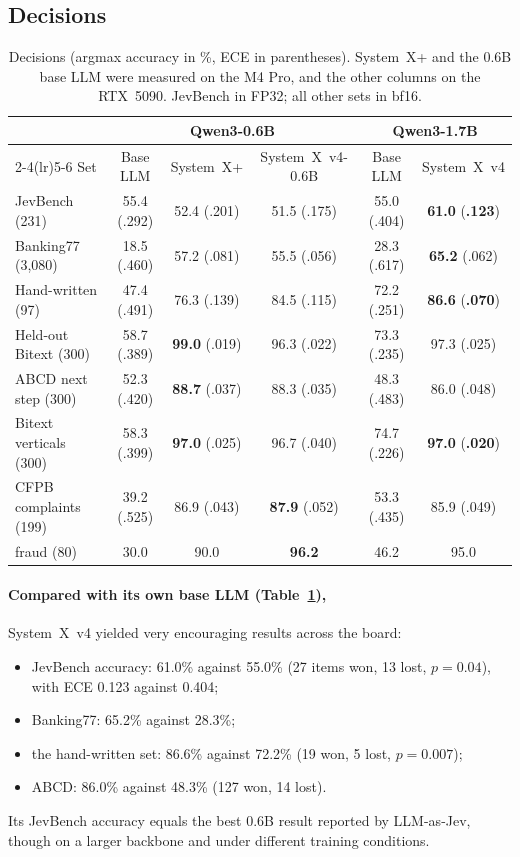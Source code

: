 \documentclass[11pt]{article}
\newcommand{\sysplus}{System~X+}
\newcommand{\sysfour}{System~X~v4}
\newcommand{\sysfoursmall}{System~X~v4-0.6B}
\begin{document}
\subsection{Decisions}

\begin{table}[t]
\centering
\caption{Decisions (argmax accuracy in \%, ECE in parentheses). \sysplus{} and the 0.6B base LLM were measured on the M4 Pro, and the other columns on the RTX~5090. JevBench in FP32; all other sets in bf16.}
\label{tab:v4}
\small
\setlength{\tabcolsep}{3pt}
\begin{tabular}{lccccc}
\toprule
& \multicolumn{3}{c}{Qwen3-0.6B} & \multicolumn{2}{c}{Qwen3-1.7B} \\
\cmidrule(lr){2-4}\cmidrule(lr){5-6}
Set & Base LLM & \sysplus{} & \sysfoursmall{} & Base LLM & \sysfour{} \\
\midrule
JevBench (231) & 55.4 (.292) & 52.4 (.201) & 51.5 (.175) & 55.0 (.404) & \textbf{61.0} (\textbf{.123}) \\
Banking77 (3{,}080) & 18.5 (.460) & 57.2 (.081) & 55.5 (.056) & 28.3 (.617) & \textbf{65.2} (.062) \\
Hand-written (97) & 47.4 (.491) & 76.3 (.139) & 84.5 (.115) & 72.2 (.251) & \textbf{86.6} (\textbf{.070}) \\
Held-out Bitext (300) & 58.7 (.389) & \textbf{99.0} (.019) & 96.3 (.022) & 73.3 (.235) & 97.3 (.025) \\
ABCD next step (300) & 52.3 (.420) & \textbf{88.7} (.037) & 88.3 (.035) & 48.3 (.483) & 86.0 (.048) \\
Bitext verticals (300) & 58.3 (.399) & \textbf{97.0} (.025) & 96.7 (.040) & 74.7 (.226) & \textbf{97.0} (\textbf{.020}) \\
CFPB complaints (199) & 39.2 (.525) & 86.9 (.043) & \textbf{87.9} (.052) & 53.3 (.435) & 85.9 (.049) \\
\quad fraud (80) & 30.0 & 90.0 & \textbf{96.2} & 46.2 & 95.0 \\
\bottomrule
\end{tabular}
\end{table}

\paragraph{Compared with its own base LLM (Table~\ref{tab:v4}),} \sysfour{} yielded very encouraging results across the board:
\begin{itemize}
\item JevBench accuracy: 61.0\% against 55.0\% (27 items won, 13 lost, $p=0.04$), with ECE 0.123 against 0.404;
\item Banking77: 65.2\% against 28.3\%;
\item the hand-written set: 86.6\% against 72.2\% (19 won, 5 lost, $p=0.007$);
\item ABCD: 86.0\% against 48.3\% (127 won, 14 lost).
\end{itemize}
Its JevBench accuracy equals the best 0.6B result reported by LLM-as-Jev, though on a larger backbone and under different training conditions.
\end{document}
